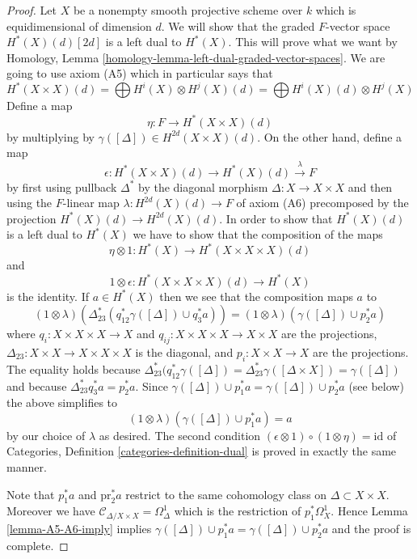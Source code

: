 \documentclass[10pt,a4paper]{amsart}
\theoremstyle{plain}
\theoremstyle{definition}
\theoremstyle{remark}
\numberwithin{equation}{subsection}
\begin{document}
\begin{proof}
Let $X$ be a nonempty smooth projective scheme over $k$ which is
equidimensional of dimension $d$. We will show that the graded $F$-vector space
$H^*(X)(d)[2d]$ is a left dual to $H^*(X)$. This will prove what we want by
Homology, Lemma \ref{homology-lemma-left-dual-graded-vector-spaces}. We are
going to use axiom (A5) which in particular says that
$$
H^*(X \times X)(d) =
\bigoplus H^i(X) \otimes H^j(X)(d) =
\bigoplus H^i(X)(d) \otimes H^j(X)
$$
Define a map
$$
\eta : F \longrightarrow H^*(X \times X)(d)
$$
by multiplying by $\gamma([\Delta]) \in H^{2d}(X \times X)(d)$.
On the other hand, define a map
$$
\epsilon :
H^*(X \times X)(d) \longrightarrow H^*(X)(d) \xrightarrow{\lambda} F
$$
by first using pullback $\Delta^*$ by the diagonal morphism
$\Delta : X \to X \times X$ and then using the $F$-linear map
$\lambda : H^{2d}(X)(d) \to F$ of axiom (A6) precomposed
by the projection $H^*(X)(d) \to H^{2d}(X)(d)$.
In order to show that $H^*(X)(d)$ is a left dual to $H^*(X)$
we have to show that the composition of the maps
$$
\eta \otimes 1 :
H^*(X) \longrightarrow H^*(X \times X \times X)(d)
$$
and
$$
1 \otimes \epsilon : H^*(X \times X \times X)(d) \longrightarrow H^*(X)
$$
is the identity. If $a \in H^*(X)$ then we see
that the composition maps $a$ to
$$
(1 \otimes \lambda)(\Delta_{23}^*(q_{12}^*\gamma([\Delta]) \cup q_3^*a)) =
(1 \otimes \lambda)(\gamma([\Delta]) \cup p_2^*a)
$$
where $q_i : X \times X \times X \to X$ and
$q_{ij} : X \times X \times X \to X \times X$ are the projections,
$\Delta_{23} : X \times X \to X \times X \times X$ is the diagonal, and
$p_i : X \times X \to X$ are the projections.
The equality holds because $\Delta_{23}^*(q_{12}^*\gamma([\Delta]) =
\Delta_{23}^*\gamma([\Delta \times X]) = \gamma([\Delta])$
and because $\Delta_{23}^* q_3^*a = p_2^*a$.
Since $\gamma([\Delta]) \cup p_1^*a = \gamma([\Delta]) \cup p_2^*a$
(see below) the above simplifies to
$$
(1 \otimes \lambda)(\gamma([\Delta]) \cup p_1^*a) = a
$$
by our choice of $\lambda$ as desired. The second condition
$(\epsilon \otimes 1) \circ (1 \otimes \eta) = \text{id}$
of Categories, Definition \ref{categories-definition-dual}
is proved in exactly the
same manner.

\medskip\noindent
Note that $p_1^*a$ and $\text{pr}_2^*a$ restrict to the same
cohomology class on $\Delta \subset X \times X$. Moreover we
have $\mathcal{C}_{\Delta/X \times X} = \Omega^1_\Delta$ which
is the restriction of $p_1^*\Omega^1_X$. Hence
Lemma \ref{lemma-A5-A6-imply} implies
$\gamma([\Delta]) \cup p_1^*a = \gamma([\Delta]) \cup p_2^*a$
and the proof is complete.
\end{proof}
\end{document}
